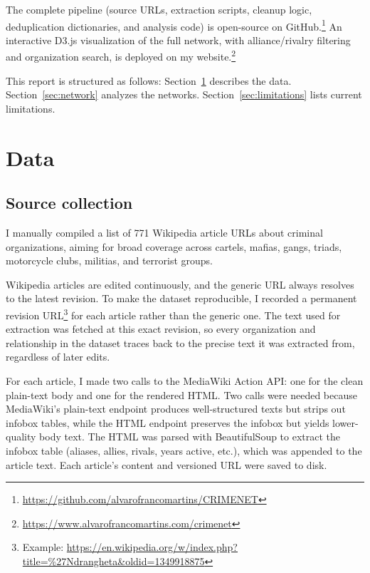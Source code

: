 \documentclass[11pt,a4paper]{article}
\begin{document}
The complete pipeline (source URLs, extraction scripts, cleanup logic, deduplication dictionaries, and analysis code) is open-source on GitHub.\footnote{\url{https://github.com/alvarofrancomartins/CRIMENET}} An interactive D3.js visualization of the full network, with alliance/rivalry filtering and organization search, is deployed on my website.\footnote{\url{https://www.alvarofrancomartins.com/crimenet}}

This report is structured as follows: Section~\ref{sec:data} describes the data. Section~\ref{sec:network} analyzes the networks. Section~\ref{sec:limitations} lists current limitations. 

\section{Data}\label{sec:data}

\subsection{Source collection}
I manually compiled a list of 771 Wikipedia article URLs about criminal organizations, aiming for broad coverage across cartels, mafias, gangs, triads, motorcycle clubs, militias, and terrorist groups. 

Wikipedia articles are edited continuously, and the generic URL always resolves to the latest revision. To make the dataset reproducible, I recorded a permanent revision URL\footnote{Example: \url{https://en.wikipedia.org/w/index.php?title=\%27Ndrangheta&oldid=1349918875}} for each article rather than the generic one. The text used for extraction was fetched at this exact revision, so every organization and relationship in the dataset traces back to the precise text it was extracted from, regardless of later edits. 

For each article, I made two calls to the MediaWiki Action API: one for the clean plain-text body and one for the rendered HTML. Two calls were needed because MediaWiki's plain-text endpoint produces well-structured texts but strips out infobox tables, while the HTML endpoint preserves the infobox but yields lower-quality body text. The HTML was parsed with BeautifulSoup to extract the infobox table (aliases, allies, rivals, years active, etc.), which was appended to the article text. Each article's content and versioned URL were saved to disk.
\end{document}
